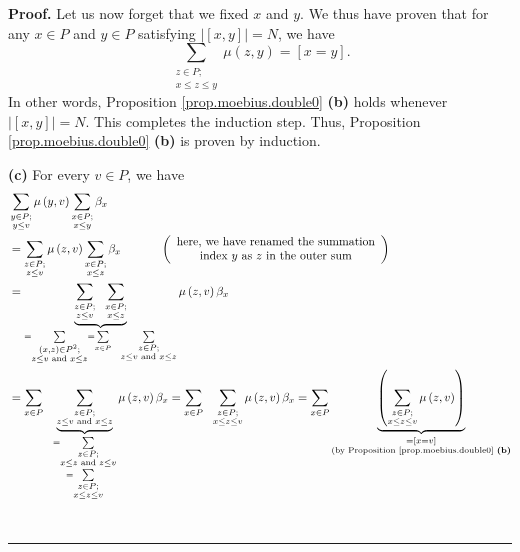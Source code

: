 \documentclass[numbers=enddot,12pt,final,onecolumn,notitlepage]{scrartcl}%
\theoremstyle{definition}
\newenvironment{proof}[1][Proof]{\noindent\textbf{#1.} }{\ \rule{0.5em}{0.5em}}
\newenvironment{verlong}{}{}
\let\sumnonlimits\sum
\renewcommand{\sum}{\sumnonlimits\limits}
\begin{document}
\begin{verlong}
\begin{proof}
Let us now forget that we fixed $x$ and $y$. We thus have proven that for any
$x\in P$ and $y\in P$ satisfying $\left\vert \left[  x,y\right]  \right\vert
=N$, we have%
\[
\sum_{\substack{z\in P;\\x\leq z\leq y}}\mu\left(  z,y\right)  =\left[
x=y\right]  .
\]
In other words, Proposition \ref{prop.moebius.double0} \textbf{(b)} holds
whenever $\left\vert \left[  x,y\right]  \right\vert =N$. This completes the
induction step. Thus, Proposition \ref{prop.moebius.double0} \textbf{(b)} is
proven by induction.

\textbf{(c)} For every $v\in P$, we have%
\begin{align*}
&  \sum_{\substack{y\in P;\\y\leq v}}\mu\left(  y,v\right)  \sum
_{\substack{x\in P;\\x\leq y}}\beta_{x}\\
&  =\sum_{\substack{z\in P;\\z\leq v}}\mu\left(  z,v\right)  \sum
_{\substack{x\in P;\\x\leq z}}\beta_{x}\ \ \ \ \ \ \ \ \ \ \left(
\begin{array}
[c]{c}%
\text{here, we have renamed the summation}\\
\text{index }y\text{ as }z\text{ in the outer sum}%
\end{array}
\right) \\
&  =\underbrace{\sum_{\substack{z\in P;\\z\leq v}}\ \ \sum_{\substack{x\in
P;\\x\leq z}}}_{=\sum_{\substack{\left(  x,z\right)  \in P^{2};\\z\leq v\text{
and }x\leq z}}=\sum_{x\in P}\ \ \sum_{\substack{z\in P;\\z\leq v\text{ and
}x\leq z}}}\mu\left(  z,v\right)  \beta_{x}\\
&  =\sum_{x\in P}\ \ \underbrace{\sum_{\substack{z\in P;\\z\leq v\text{ and
}x\leq z}}}_{\substack{=\sum_{\substack{z\in P;\\x\leq z\text{ and }z\leq
v}}\\=\sum_{\substack{z\in P;\\x\leq z\leq v}}}}\mu\left(  z,v\right)
\beta_{x}=\sum_{x\in P}\ \ \sum_{\substack{z\in P;\\x\leq z\leq v}}\mu\left(
z,v\right)  \beta_{x}=\sum_{x\in P}\underbrace{\left(  \sum_{\substack{z\in
P;\\x\leq z\leq v}}\mu\left(  z,v\right)  \right)  }_{\substack{=\left[
x=v\right]  \\\text{(by Proposition \ref{prop.moebius.double0} \textbf{(b)}%
}}}
\end{align*}
\end{proof}
\end{verlong}
\end{document}
